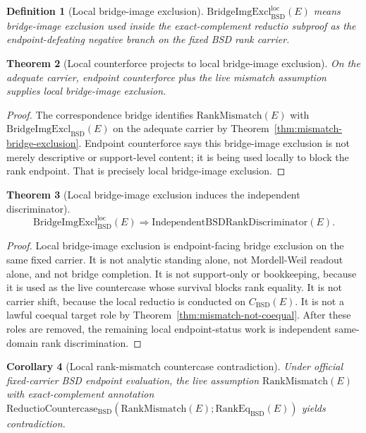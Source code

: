 \documentclass[11pt]{article}
\newtheorem{theorem}{Theorem}[section]
\newtheorem{corollary}[theorem]{Corollary}
\newtheorem{definition}[theorem]{Definition}
\newcommand{\BSD}{\mathrm{BSD}}
\newcommand{\RankMismatch}{\mathrm{RankMismatch}}
\newcommand{\BridgeImgExcl}{\mathrm{BridgeImgExcl}_{\BSD}}
\newcommand{\BridgeImgExclLoc}{\mathrm{BridgeImgExcl}^{\mathrm{loc}}_{\BSD}}
\newcommand{\RankEq}{\mathrm{RankEq}_{\BSD}}
\newcommand{\ReductioBSD}{\mathrm{ReductioCountercase}_{\BSD}}
\begin{document}
\begin{definition}[Local bridge-image exclusion]
$\BridgeImgExclLoc(E)$ means bridge-image exclusion used inside the exact-complement reductio subproof as the endpoint-defeating negative branch on the fixed BSD rank carrier.
\end{definition}

\begin{theorem}[Local counterforce projects to local bridge-image exclusion]\label{thm:local-counterforce-bridge-exclusion}
On the adequate carrier, endpoint counterforce plus the live mismatch assumption supplies local bridge-image exclusion.
\end{theorem}

\begin{proof}
The correspondence bridge identifies $\RankMismatch(E)$ with $\BridgeImgExcl(E)$ on the adequate carrier by Theorem~\ref{thm:mismatch-bridge-exclusion}. Endpoint counterforce says this bridge-image exclusion is not merely descriptive or support-level content; it is being used locally to block the rank endpoint. That is precisely local bridge-image exclusion.
\end{proof}

\begin{theorem}[Local bridge-image exclusion induces the independent discriminator]\label{thm:local-bridge-exclusion-independent}
\[
\BridgeImgExclLoc(E)
\Rightarrow
\mathrm{IndependentBSDRankDiscriminator}(E).
\]
\end{theorem}

\begin{proof}
Local bridge-image exclusion is endpoint-facing bridge exclusion on the same fixed carrier. It is not analytic standing alone, not Mordell-Weil readout alone, and not bridge completion. It is not support-only or bookkeeping, because it is used as the live countercase whose survival blocks rank equality. It is not carrier shift, because the local reductio is conducted on $C_{\BSD}(E)$. It is not a lawful coequal target role by Theorem~\ref{thm:mismatch-not-coequal}. After these roles are removed, the remaining local endpoint-status work is independent same-domain rank discrimination.
\end{proof}

\begin{corollary}[Local rank-mismatch countercase contradiction]\label{cor:local-rank-mismatch-contradiction}
Under official fixed-carrier BSD endpoint evaluation, the live assumption $\RankMismatch(E)$ with exact-complement annotation $\ReductioBSD(\RankMismatch(E);\RankEq(E))$ yields contradiction.
\end{corollary}
\end{document}
